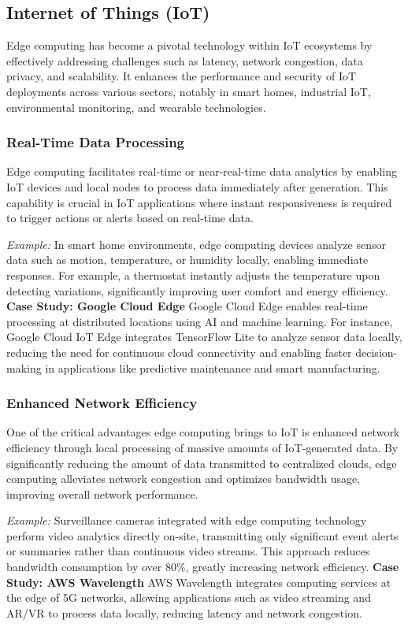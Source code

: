 \documentclass[runningheads]{llncs}
\begin{document}
\subsection{Internet of Things (IoT)}

Edge computing has become a pivotal technology within IoT ecosystems by effectively addressing challenges such as latency, network congestion, data privacy, and scalability. It enhances the performance and security of IoT deployments across various sectors, notably in smart homes, industrial IoT, environmental monitoring, and wearable technologies.

\subsubsection{Real-Time Data Processing}
Edge computing facilitates real-time or near-real-time data analytics by enabling IoT devices and local nodes to process data immediately after generation. This capability is crucial in IoT applications where instant responsiveness is required to trigger actions or alerts based on real-time data.

\noindent\textit{Example:} In smart home environments, edge computing devices analyze sensor data such as motion, temperature, or humidity locally, enabling immediate responses. For example, a thermostat instantly adjusts the temperature upon detecting variations, significantly improving user comfort and energy efficiency.
\noindent\textbf{Case Study: Google Cloud Edge}
Google Cloud Edge enables real-time processing at distributed locations using AI and machine learning. For instance, Google Cloud IoT Edge integrates TensorFlow Lite to analyze sensor data locally, reducing the need for continuous cloud connectivity and enabling faster decision-making in applications like predictive maintenance and smart manufacturing.
\subsubsection{Enhanced Network Efficiency}
One of the critical advantages edge computing brings to IoT is enhanced network efficiency through local processing of massive amounts of IoT-generated data. By significantly reducing the amount of data transmitted to centralized clouds, edge computing alleviates network congestion and optimizes bandwidth usage, improving overall network performance.

\noindent\textit{Example:} Surveillance cameras integrated with edge computing technology perform video analytics directly on-site, transmitting only significant event alerts or summaries rather than continuous video streams. This approach reduces bandwidth consumption by over 80\%, greatly increasing network efficiency.
\noindent\textbf{Case Study: AWS Wavelength}
AWS Wavelength integrates computing services at the edge of 5G networks, allowing applications such as video streaming and AR/VR to process data locally, reducing latency and network congestion. 
\end{document}
